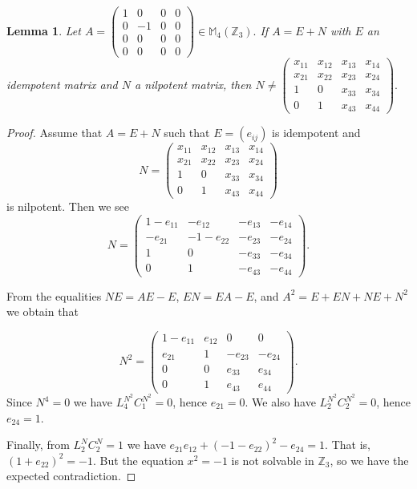 \documentclass[12]{amsart}
\newtheorem{lem}[thm]{Lemma}
\theoremstyle{definition}
\numberwithin{equation}{section}
\begin{document}
\begin{lem}\label{nonil}
Let $A=\begin{pmatrix}
               1 & 0 & 0 & 0 \\
               0 & -1 & 0 & 0\\
               0 & 0 & 0 & 0 \\
               0 & 0 & 0 & 0
              \end{pmatrix}\in\mathbb{M}_4({{\mathbb Z}}_3).$
If $A=E+N$ with $E$ an idempotent matrix and $N$ a nilpotent matrix, then $N\not= \begin{pmatrix}
               x_{11} & x_{12} & x_{13} & x_{14} \\
               x_{21} & x_{22} & x_{23} & x_{24}\\
               1 & 0 & x_{33} & x_{34} \\
               0 & 1 & x_{43} & x_{44}
      \end{pmatrix}.$
 \end{lem}
\begin{proof}
Assume that $A=E+N$ such that $E=(e_{ij})$ is idempotent and $$N=\begin{pmatrix}
               x_{11} & x_{12} & x_{13} & x_{14} \\
               x_{21} & x_{22} & x_{23} & x_{24}\\
               1 & 0 & x_{33} & x_{34} \\
               0 & 1 & x_{43} & x_{44}
      \end{pmatrix}$$
			is nilpotent. Then we see
$$ N=\begin{pmatrix}
               1-e_{11} & -e_{12} & -e_{13} & -e_{14} \\
               -e_{21} & -1-e_{22} & -e_{23} & -e_{24}\\
               1 & 0 & -e_{33} & -e_{34} \\
               0 & 1 & -e_{43} & -e_{44}
      \end{pmatrix}.$$
			
\noindent From the equalities
$NE=AE-E$, $EN=EA-E$, and $A^2=E+EN+NE+N^2$ we obtain that

  $$    N^2=\begin{pmatrix}
               1-e_{11} & e_{12} & 0 & 0 \\
               e_{21} & 1 & -e_{23} & -e_{24}\\
               0 & 0 & e_{33} & e_{34} \\
               0 & 1 & e_{43} & e_{44}
      \end{pmatrix}.$$
Since $N^4=0$ we have $L_4^{N^2}C_1^{N^2}=0$, hence $e_{21}=0$. We also have $L_2^{N^2}C_2^{N^2}=0$, hence $e_{24}=1$.

Finally, from $L_2^{N}C_2^{N}=1$ we have $e_{21}e_{12}+(-1-e_{22})^2-e_{24}=1$. That is, $(1+e_{22})^2=-1$.
But the equation $x^2=-1$ is not solvable in ${{\mathbb Z}}_3$, so we have the expected contradiction.
\end{proof}
\end{document}
